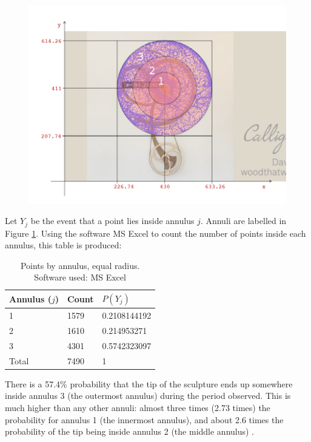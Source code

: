 \documentclass[a4paper,12pt]{article}
\begin{document}
    \begin{figure}[H]
        \begin{center}
            \includegraphics[width=\textwidth]{rings_equalRadii} 
        \end{center}
        \caption{}
        \label{fig:rings_equalRadii}
    \end{figure}
    Let $Y_j$ be the event that a point lies inside annulus $j$. Annuli are labelled in Figure \ref{fig:rings_equalRadii}. Using the software MS Excel to count the number of points inside each annulus, this table is produced:
    \begin{table}[H]
        \centering
        \begin{tabular}{|l|l|l|}
            \toprule
            Annulus ($j$) & Count & $P(Y_j)$\\
            \midrule
            1 & 1579 & 0.2108144192\\
            2 & 1610 & 0.214953271\\
            3 & 4301 & 0.5742323097\\
            \midrule
            Total & 7490 & 1\\
            \bottomrule
        \end{tabular}
        \caption{\label{tab:ring1}Points by annulus, equal radius. Software used: MS Excel}
    \end{table}

    There is a 57.4\% probability that the tip of the sculpture ends up somewhere inside annulus 3 (the outermost annulus) during the period observed. This is much higher than any other annuli: almost three times (2.73 times) the probability for annulus 1 (the innermost annulus), and about 2.6 times the probability of the tip being inside annulus 2 (the middle annulus) .
\end{document}
